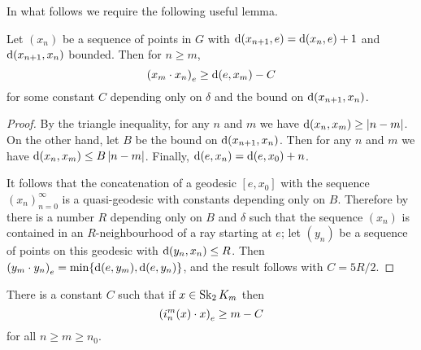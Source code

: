 \documentclass[a4paper]{article}
\begin{document}
In what follows we require the following useful lemma.

\begin{lemma}\label{lem:useful}
  Let $(x_n)$ be a sequence of points in $G$ with $\dist(x_{n+1}, e) = 
  \dist(x_n, e) + 1$ and $\dist(x_{n+1}, x_n)$ bounded. Then for $n \geq m$,
  \begin{equation*}
    \gromov{e}{x_m}{x_n} \geq \dist(e,x_m) - C
  \end{equation*}
  for some constant $C$ depending only on $\delta$ and the bound on 
  $\dist(x_{n+1}, x_n)$.
\end{lemma}

\begin{proof}
  By the triangle inequality, for any $n$ and $m$ we have $\dist(x_n, x_m) \geq
  \abs{n - m}$.  On the other hand, let $B$ be the bound on $\dist(x_{n+1},
  x_n)$. Then for any $n$ and $m$ we have $\dist(x_n, x_m) \leq B\abs{n - m}$. 
  Finally, $\dist(e, x_n) = \dist(e, x_0) + n$.
  
  It follows that the concatenation of a geodesic $[e, x_0]$ with the sequence
  $(x_n)_{n = 0}^\infty$ is a quasi-geodesic with constants depending only on
  $B$. Therefore by~\cite[Theorem III.H.1.7]{bridsonhaefliger99} there is a
  number $R$ depending only on $B$ and $\delta$ such that the sequence $(x_n)$
  is contained in an $R$-neighbourhood of a ray starting at $e$; let $(y_n)$ be
  a sequence of points on this geodesic with $\dist(y_n, x_n) \leq R$. Then
  $\gromov{e}{y_m}{y_n} = \min\{\dist(e, y_m), \dist(e, y_n)\}$, and the result
  follows with $C = 5R/2$.
\end{proof}

\begin{lemma}\label{lem:linearproduct}
  There is a constant $C$ such that if $x \in \Skel_2 K_m$ then
  \begin{equation*}
    \gromov{e}{i^m_n(x)}{x} \geq m - C
  \end{equation*}
  for all $n\geq m\geq n_0$.
\end{lemma}
\end{document}
